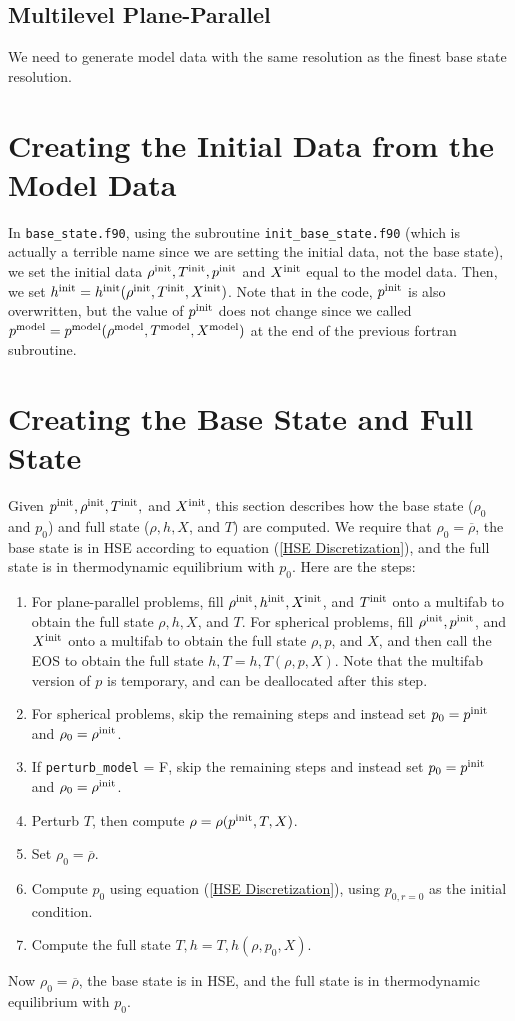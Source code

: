 \documentclass[11pt]{article}
\def\init  {\rm init}
\def\model {\rm model}
\begin{document}
\subsection{Multilevel Plane-Parallel}
We need to generate model data with the same resolution as the finest base state resolution.
\section{Creating the Initial Data from the Model Data}
In {\tt base\_state.f90}, using the subroutine {\tt init\_base\_state.f90} (which is actually a terrible name since we are setting the initial data, not the base state), we set the initial data $\rho^{\init}, T^{\init}, p^{\init}$ and $X^{\init}$ equal to the model data.  Then, we set $h^{\init} = h^{\init}(\rho^{\init},T^{\init},X^{\init})$.  Note that in the code, $p^{\init}$ is also overwritten, but the value of $p^{\init}$ does not change since we called $p^{\model} = p^{\model}(\rho^{\model},T^{\model},X^{\model})$ at the end of the previous fortran subroutine.
\section{Creating the Base State and Full State}
Given $p^{\init}, \rho^{\init}, T^{\init},$ and $X^{\init}$, this section describes how the base state ($\rho_0$ and $p_0$) and full state ($\rho, h, X$, and $T$) are computed.  We require that $\rho_0 = \overline\rho$, the base state is in HSE according to equation (\ref{HSE Discretization}), and the full state is in thermodynamic equilibrium with $p_0$.  Here are the steps:
\begin{enumerate}
\item For plane-parallel problems, fill $\rho^{\init}, h^{\init}, X^{\init}$, and $T^{\init}$ onto a multifab to obtain the full state $\rho, h, X$, and $T$.  For spherical problems, fill $\rho^{\init}, p^{\init}$, and $X^{\init}$ onto a multifab to obtain the full state $\rho, p$, and $X$, and then call the EOS to obtain the full state $h,T = h,T(\rho,p,X)$.  Note that the multifab version of $p$ is temporary, and can be deallocated after this step.
\item For spherical problems, skip the remaining steps and instead set $p_0 = p^{\init}$ and $\rho_0 = \rho^{\init}$.
\item If {\tt perturb\_model} = F, skip the remaining steps and instead set $p_0 = p^{\init}$ and $\rho_0 = \rho^{\init}$.
\item Perturb $T$, then compute $\rho = \rho(p^{\init},T,X)$.
\item Set $\rho_0 = \overline\rho$.
\item Compute $p_0$ using equation (\ref{HSE Discretization}), using $p_{0,r=0}$ as the initial condition.
\item Compute the full state $T,h = T,h(\rho,p_0,X)$.
\end{enumerate}
Now $\rho_0 = \overline\rho$, the base state is in HSE, and the full state is in thermodynamic equilibrium with $p_0$.
\end{document}
